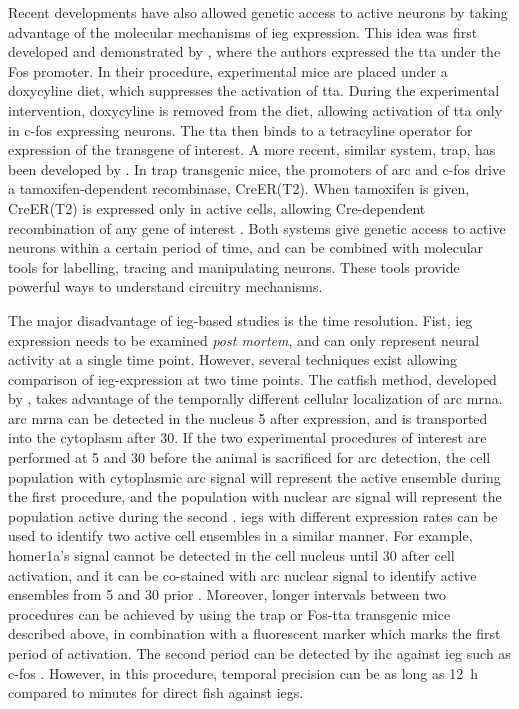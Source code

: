 Recent developments have also allowed genetic access to active neurons by taking advantage of the molecular mechanisms of \gls{ieg} expression. This idea was first developed and demonstrated by \citet{reijmers07}, where the authors expressed the \gls{tta} under the Fos promoter. In their procedure, experimental mice are placed under a doxycyline diet, which suppresses the activation of \gls{tta}. During the experimental intervention, doxycyline is removed from the diet, allowing activation of \gls{tta} only in c-fos expressing neurons. The \gls{tta} then binds to a tetracyline operator for expression of the transgene of interest. A more recent, similar system, \gls{trap}, has been developed by \citet{guenthner13}. In \gls{trap} transgenic mice, the promoters of \gls{arc} and c-fos drive a tamoxifen-dependent recombinase, CreER(T2). When tamoxifen is given, CreER(T2) is expressed only in active cells, allowing Cre-dependent recombination of any gene of interest \citep{guenthner13}. Both systems give genetic access to active neurons within a certain period of time, and can be combined with molecular tools for labelling, tracing and manipulating neurons. These tools provide powerful ways to understand circuitry mechanisms.

The major disadvantage of \gls{ieg}-based studies is the time resolution. Fist, \gls{ieg} expression needs to be examined \textit{post mortem}, and can only represent neural activity at a single time point. However, several techniques exist allowing comparison of \gls{ieg}-expression at two time points. The \gls{catfish}  method, developed by \citet{guzowski99}, takes advantage of the temporally different cellular localization of \gls{arc} \gls{mrna}. \Gls{arc} \gls{mrna} can be detected in the nucleus \SI{5}{\min} after expression, and is transported into the cytoplasm after \SI{30}{\min}. If the two experimental procedures of interest are performed at \SI{5}{\min} and \SI{30}{\min} before the animal is sacrificed for \gls{arc} detection, the cell population with cytoplasmic \gls{arc} signal will represent the active ensemble during the first procedure, and the population with nuclear \gls{arc} signal will represent the population active during the second \citep{guzowski99}. \Glspl{ieg} with different expression rates can be used to identify two active cell ensembles in a similar manner. For example, homer1a's signal cannot be detected in the cell nucleus until \SI{30}{\min} after cell activation, and it can be co-stained with \gls{arc} nuclear signal to identify active ensembles from \SI{5}{\min} and \SI{30}{\min} prior \citep{vazdarjanova04}. Moreover, longer intervals between two procedures can be achieved by using the \gls{trap} or Fos-\gls{tta} transgenic mice described above, in combination with a fluorescent marker which marks the first period of activation. The second period can be detected by \gls{ihc} against \gls{ieg} such as c-fos \citep{reijmers07, guenthner13}. However, in this procedure, temporal precision can be as long as \SI{12}{\hour} compared to minutes for direct \gls{fish} against \glspl{ieg}.

